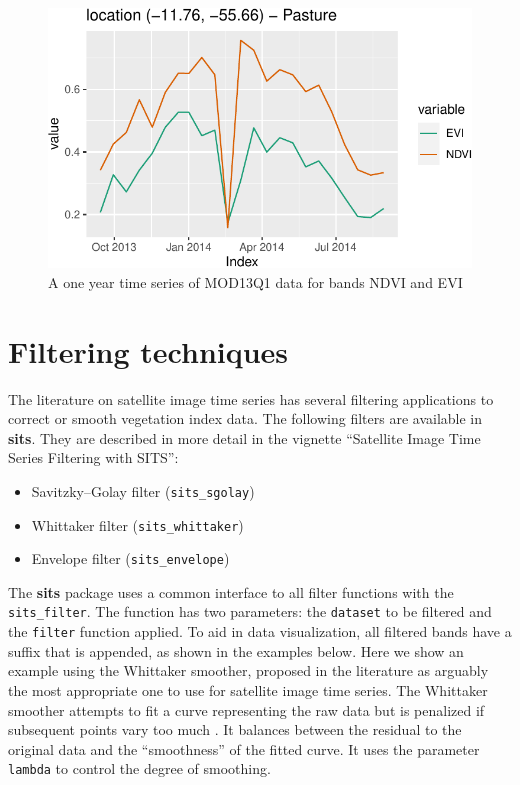 \documentclass[a4paper,]{tufte-book}
\providecommand{\tightlist}{%
  \setlength{\itemsep}{0pt}\setlength{\parskip}{0pt}}
\begin{document}
\begin{figure}

{\centering \includegraphics[width=0.7\linewidth]{sitsbook_files/figure-latex/unnamed-chunk-10-1} 

}

\caption[A one year time series of MOD13Q1 data for bands NDVI and EVI]{A one year time series of MOD13Q1 data for bands NDVI and EVI}\label{fig:unnamed-chunk-10}
\end{figure}

\hypertarget{filtering-techniques}{%
\section{Filtering techniques}\label{filtering-techniques}}

The literature on satellite image time series has several filtering applications to correct or smooth vegetation index data. The following filters are available in \textbf{sits}. They are described in more detail in the vignette ``Satellite Image Time Series Filtering with SITS'':

\begin{itemize}
\tightlist
\item
  Savitzky--Golay filter (\texttt{sits\_sgolay})
\item
  Whittaker filter (\texttt{sits\_whittaker})
\item
  Envelope filter (\texttt{sits\_envelope})
\end{itemize}

The \textbf{sits} package uses a common interface to all filter functions with the \texttt{sits\_filter}. The function has two parameters: the \texttt{dataset} to be filtered and the \texttt{filter} function applied. To aid in data visualization, all filtered bands have a suffix that is appended, as shown in the examples below. Here we show an example using the Whittaker smoother, proposed in the literature \citep{Atzberger2011} as arguably the most appropriate one to use for satellite image time series. The Whittaker smoother attempts to fit a curve representing the raw data but is penalized if subsequent points vary too much \citep{Atzberger2011}. It balances between the residual to the original data and the ``smoothness'' of the fitted curve. It uses the parameter \texttt{lambda} to control the degree of smoothing.
\end{document}
